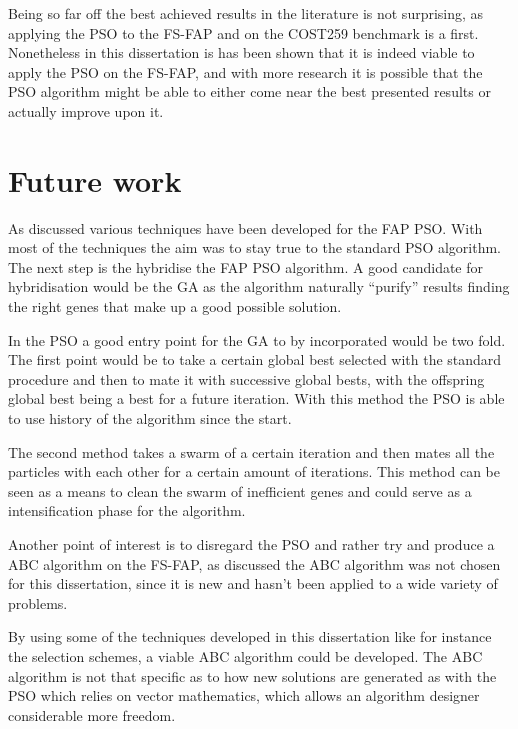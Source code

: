 Being so far off the best achieved results in the literature is not surprising, as applying the PSO to the FS-FAP and on the COST259 benchmark is a first. Nonetheless in this dissertation is has been shown that it is indeed viable to apply the PSO on the FS-FAP, and with more research it is possible that the PSO algorithm might be able to either come near the best presented results or actually improve upon it.

\section{Future work}
As discussed various techniques have been developed for the FAP PSO. With most of the techniques the aim was to stay true to the standard PSO algorithm. The next step is the hybridise the FAP PSO algorithm. A good candidate for hybridisation would be the GA as the algorithm naturally ``purify'' results finding the right genes that make up a good possible solution.

In the PSO a good entry point for the GA to by incorporated would be two fold. The first point would be to take a certain global best selected with the standard procedure and then to mate it with successive global bests, with the offspring global best being a best for a future iteration. With this method the PSO is able to use history of the algorithm since the start.

The second method takes a swarm of a certain iteration and then mates all the particles with each other for a certain amount of iterations. This method can be seen as a means to clean the swarm of inefficient genes and could serve as a intensification phase for the algorithm.

Another point of interest is to disregard the PSO and rather try and produce a ABC algorithm on the FS-FAP, as discussed the ABC algorithm was not chosen for this dissertation, since it is new and hasn't been applied to a wide variety of problems. 

By using some of the techniques developed in this dissertation like for instance the selection schemes, a viable ABC algorithm could be developed. The ABC algorithm is not that specific as to how new solutions are generated as with the PSO which relies on vector mathematics, which allows an algorithm designer considerable more freedom.





